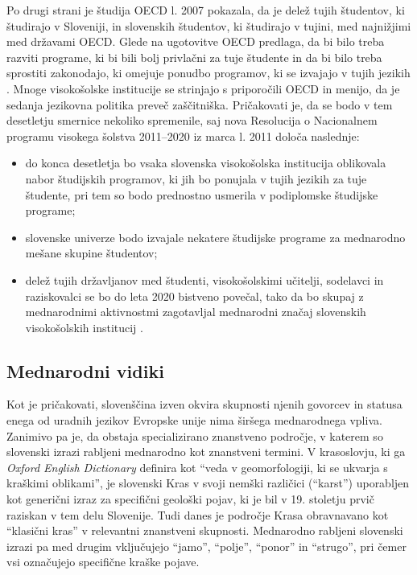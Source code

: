 \begin{multicols}{2}
Po drugi strani je študija OECD l. 2007 pokazala, da je delež tujih študentov, ki študirajo v Sloveniji, in slovenskih študentov, ki študirajo v tujini, med najnižjimi med državami OECD. Glede na ugotovitve OECD predlaga, da bi bilo treba razviti programe, ki bi bili bolj privlačni za tuje študente in da bi bilo treba sprostiti zakonodajo, ki omejuje ponudbo programov, ki se izvajajo v tujih jezikih \cite{OECD1}. Mnoge visokošolske institucije se strinjajo s priporočili OECD in menijo, da je sedanja jezikovna politika preveč zaščitniška. 
Pričakovati je, da se bodo v tem desetletju smernice nekoliko spremenile, saj nova Resolucija o Nacionalnem programu visokega šolstva 2011–2020 iz marca l. 2011 določa naslednje: 
\begin{itemize}
\item do konca desetletja bo vsaka slovenska visokošolska institucija oblikovala nabor študijskih programov, ki jih bo ponujala v tujih jezikih za tuje študente, pri tem so bodo prednostno usmerila v podiplomske študijske programe;
\item slovenske univerze bodo izvajale nekatere študijske programe za mednarodno mešane skupine študentov;
\item delež tujih državljanov med študenti, visokošolskimi učitelji, sodelavci in raziskovalci se bo do leta 2020 bistveno povečal, tako da bo skupaj z mednarodnimi aktivnostmi zagotavljal mednarodni značaj slovenskih visokošolskih institucij \cite{UradniList1}.
\end{itemize}

\subsection{Mednarodni vidiki}

Kot je pričakovati, slovenščina izven okvira skupnosti njenih govorcev in statusa enega od uradnih jezikov Evropske unije nima širšega mednarodnega vpliva. Zanimivo pa je, da obstaja specializirano znanstveno področje, v katerem so slovenski izrazi rabljeni mednarodno kot znanstveni termini. V krasoslovju, ki ga \textit{Oxford English Dictionary} definira kot “veda v geomorfologiji, ki se ukvarja s kraškimi oblikami”, je slovenski Kras v svoji nemški različici (“karst”) uporabljen kot generični izraz za specifični geološki pojav, ki je bil v 19. stoletju prvič raziskan v tem delu Slovenije. Tudi danes je področje Krasa obravnavano kot “klasični kras” v rele\-vantni znanstveni skupnosti. Mednarodno rabljeni slovenski izrazi pa med drugim vključujejo “jamo”, “polje”, “ponor” in “strugo”, pri čemer vsi označujejo specifične kraške pojave.


\end{multicols}
